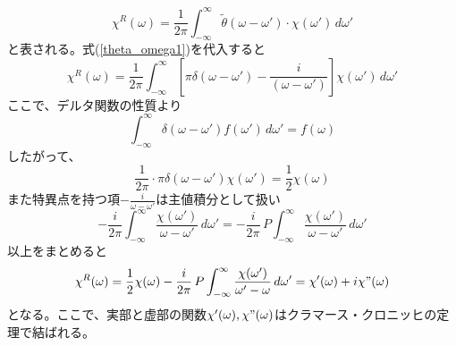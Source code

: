 \documentclass[11pt,a4j]{jreport}
\begin{document}
\begin{equation}
  \chi^R(\omega) = \frac{1}{2\pi}\int_{-\infty}^{\infty} \tilde{\theta}(\omega - \omega') \cdot \chi(\omega') \, d\omega'
\end{equation}
と表される。式(\ref{theta_omega1})を代入すると
\begin{equation}
  \chi^R(\omega) = \frac{1}{2\pi} \int_{-\infty}^{\infty} \left[ \pi \delta(\omega - \omega') - \frac{i}{(\omega - \omega')} \right]\chi(\omega') \, d\omega'
\end{equation}
ここで、デルタ関数の性質より
\begin{equation}
  \int_{-\infty}^{\infty} \delta(\omega - \omega') f(\omega') \, d\omega' = f(\omega)
\end{equation}
したがって、
\begin{equation}
  \frac{1}{2\pi} \cdot \pi \delta(\omega - \omega') \chi(\omega') = \frac{1}{2} \chi(\omega)
\end{equation}
また特異点を持つ項$-\frac{i}{\omega-\omega'}$は主値積分として扱い
\begin{equation}
  -\frac{i}{2\pi} \int_{-\infty}^{\infty} \frac{\chi(\omega')}{\omega - \omega'} \, d\omega' = -\frac{i}{2\pi} \, P\int_{-\infty}^{\infty} \frac{\chi(\omega')}{\omega - \omega'} \, d\omega'
\end{equation}
以上をまとめると
\begin{equation}
  \chi^R(\omega) = \frac{1}{2} \chi(\omega) - \frac{i}{2\pi} \, P \int_{-\infty}^{\infty} \frac{\chi(\omega')}{\omega' - \omega} \, d\omega'=\chi'(\omega)+i\chi"(\omega)
\end{equation}
となる。ここで、実部と虚部の関数$\chi'(\omega),\chi"(\omega)$はクラマース・クロニッヒの定理で結ばれる。
\end{document}
